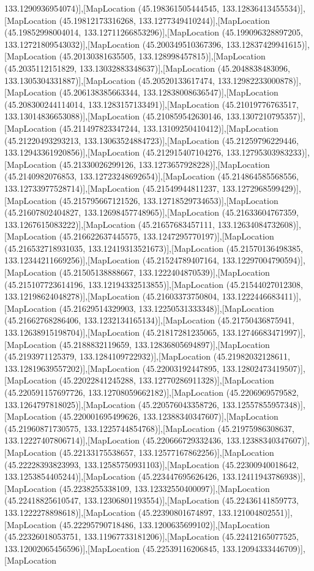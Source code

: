 133.1290936954074)],[MapLocation (45.198361505444545, 133.12836413455534)],[MapLocation (45.19812173316268, 133.1277349410244)],[MapLocation (45.19852998004014, 133.12711266853296)],[MapLocation (45.199096328897205, 133.12721809543032)],[MapLocation (45.200349510367396, 133.12837429941615)],[MapLocation (45.20130381635505, 133.128998457815)],[MapLocation (45.2035112151829, 133.13032883348637)],[MapLocation (45.2048838483096, 133.1305304331887)],[MapLocation (45.20520133617474, 133.12982233000878)],[MapLocation (45.206138385663344, 133.12838008636547)],[MapLocation (45.208300244114014, 133.1283157133491)],[MapLocation (45.21019776763517, 133.13014836653088)],[MapLocation (45.210859542630146, 133.1307210795357)],[MapLocation (45.211497823347244, 133.13109250410412)],[MapLocation (45.21220493293213, 133.13063524884723)],[MapLocation (45.21259796229446, 133.12943361920856)],[MapLocation (45.212915407104276, 133.12795303983233)],[MapLocation (45.21330026299126, 133.1273657928228)],[MapLocation (45.2140982076853, 133.12723248692654)],[MapLocation (45.214864585568556, 133.12733977528714)],[MapLocation (45.21549944811237, 133.1272968599429)],[MapLocation (45.215795667121526, 133.12718529734653)],[MapLocation (45.21607802404827, 133.12698457748965)],[MapLocation (45.21633604767359, 133.1267615083222)],[MapLocation (45.21657683457111, 133.12634084732608)],[MapLocation (45.216622637445575, 133.1247295770197)],[MapLocation (45.216532718931035, 133.12419313521673)],[MapLocation (45.21570136498385, 133.12344211669256)],[MapLocation (45.21524789407164, 133.12297004790594)],[MapLocation (45.21505138888667, 133.1222404870539)],[MapLocation (45.215107723614196, 133.12194332513855)],[MapLocation (45.21544027012308, 133.12198624048278)],[MapLocation (45.21603373750804, 133.1222446683411)],[MapLocation (45.21629514329903, 133.12250531333348)],[MapLocation (45.21662768286406, 133.1232134165134)],[MapLocation (45.21750436875941, 133.12638915198704)],[MapLocation (45.21817281235065, 133.12746683471997)],[MapLocation (45.2188832119659, 133.12836805694897)],[MapLocation (45.2193971125379, 133.1284109722932)],[MapLocation (45.21982032128611, 133.12819639557202)],[MapLocation (45.22003192447895, 133.12802473419507)],[MapLocation (45.22022841245288, 133.12770286911328)],[MapLocation (45.220591157697726, 133.12708059662182)],[MapLocation (45.2206969579582, 133.1264797818025)],[MapLocation (45.220576043358726, 133.12557855957348)],[MapLocation (45.220001695499626, 133.12388340347607)],[MapLocation (45.21960871730575, 133.1225744854768)],[MapLocation (45.21975986308637, 133.12227407806714)],[MapLocation (45.220666729332436, 133.12388340347607)],[MapLocation (45.22133175538657, 133.12577167862256)],[MapLocation (45.22228393823993, 133.12585750931103)],[MapLocation (45.22300940018642, 133.1253854405244)],[MapLocation (45.223447695626426, 133.12411943786938)],[MapLocation (45.2238255338109, 133.12332550400097)],[MapLocation (45.22418825610547, 133.12306801193554)],[MapLocation (45.22436141859773, 133.1222278898618)],[MapLocation (45.22390801674897, 133.121004802551)],[MapLocation (45.22295790718486, 133.1200635699102)],[MapLocation (45.22326018053751, 133.11967733181206)],[MapLocation (45.22412165077525, 133.12002065456596)],[MapLocation (45.22539116206845, 133.12094333446709)],[MapLocation 